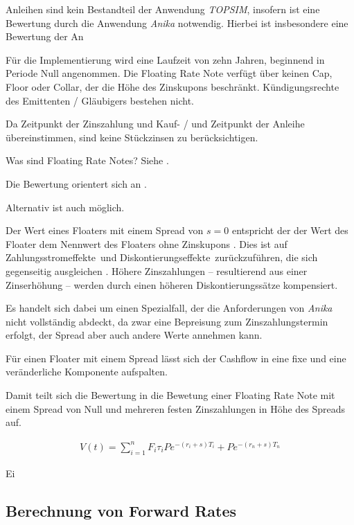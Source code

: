 \documentclass[12pt, a4paper]{article}
\begin{document}
Anleihen sind kein Bestandteil der Anwendung \textit{TOPSIM}, insofern ist eine Bewertung durch die Anwendung \textit{Anika} notwendig.
Hierbei ist insbesondere eine Bewertung der An

Für die Implementierung wird eine Laufzeit von zehn Jahren, beginnend in Periode Null angenommen.
Die Floating Rate Note verfügt über keinen Cap, Floor oder Collar, der die Höhe des Zinskupons beschränkt.
Kündigungsrechte des Emittenten / Gläubigers bestehen nicht.

Da Zeitpunkt der Zinszahlung und Kauf- / und Zeitpunkt der Anleihe übereinstimmen, sind keine Stückzinsen zu berücksichtigen.

Was sind Floating Rate Notes? Siehe \autocite[][]{fabozzi_handbook_2005}.

Die Bewertung orientert sich an \autocite[][]{veronesi_fixed_2010}.

Alternativ ist auch \autocite[][]{fabozzi_handbook_2005} möglich.

Der Wert eines Floaters mit einem Spread von $s=0$ entspricht der der Wert des Floater dem Nennwert des Floaters ohne Zinskupons \autocite[][S.~52~f.]{veronesi_fixed_2010}. Dies ist auf \glqq Zahlungsstromeffekte\grqq~und \glqq Diskontierungseffekte\grqq~zurückzuführen, die sich gegenseitig ausgleichen \autocite[][S.~54]{veronesi_fixed_2010}. Höhere Zinszahlungen -- resultierend aus einer Zinserhöhung -- werden durch einen höheren Diskontierungssätze kompensiert.

Es handelt sich dabei um einen Spezialfall, der die Anforderungen von \textit{Anika} nicht vollständig abdeckt, da zwar eine Bepreisung zum Zinszahlungstermin erfolgt, der Spread aber auch andere Werte annehmen kann.

Für einen Floater mit einem Spread lässt sich der Cashflow in eine fixe und eine veränderliche Komponente aufspalten.

Damit teilt sich die Bewertung in die Bewetung einer Floating Rate Note mit einem Spread von Null und mehreren festen Zinszahlungen in Höhe des Spreads auf.


\begin{align}
	V(t)=\sum_{i=1}^{n} F_{i} \tau_{i} P e^{-\left(r_{i}+s\right) T_{i}}+P e^{-\left(r_{n}+s\right) T_{n}}
\end{align}


Ei

\subsection{Berechnung von Forward Rates}
\end{document}
